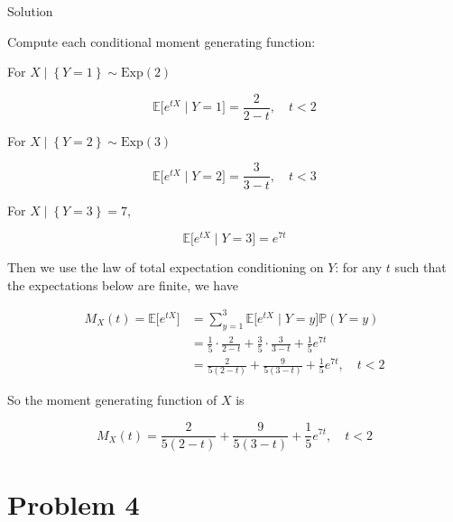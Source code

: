 \begin{qlsolution}{Solution}

Compute each conditional moment generating function:

For \(\mathit{X} \mid \left\{ {\mathit{Y} = 1} \right\} \sim \text{Exp}(2)\)

\[\mathbb{E}\lbrack\mathit{e}^{\mathit{t}\mathit{X}} \mid \mathit{Y} = 1\rbrack = \frac{2}{2 - \mathit{t}},\quad\mathit{t} < 2\]

For \(\mathit{X} \mid \left\{ {\mathit{Y} = 2} \right\} \sim \text{Exp}(3)\)

\[\mathbb{E}\lbrack\mathit{e}^{\mathit{t}\mathit{X}} \mid \mathit{Y} = 2\rbrack = \frac{3}{3 - \mathit{t}},\quad\mathit{t} < 3\]

For \(\mathit{X} \mid \left\{ {\mathit{Y} = 3} \right\} = 7\),

\[\mathbb{E}\lbrack\mathit{e}^{\mathit{t}\mathit{X}} \mid \mathit{Y} = 3\rbrack = \mathit{e}^{7\mathit{t}}\]

Then we use the law of total expectation conditioning on \(\mathit{Y}\): for any \(\mathit{t}\) such that the expectations below are finite, we have

\[\begin{matrix}
{\mathit{M}_{\mathit{X}}(\mathit{t}) = \mathbb{E}\lbrack\mathit{e}^{\mathit{t}\mathit{X}}\rbrack} & {= \sum\limits_{\mathit{y} = 1}^{3}\mathbb{E}\lbrack\mathit{e}^{\mathit{t}\mathit{X}} \mid \mathit{Y} = \mathit{y}\rbrack\mathbb{P}(\mathit{Y} = \mathit{y})} \\
 & {= \frac{1}{5} \cdot \frac{2}{2 - \mathit{t}} + \frac{3}{5} \cdot \frac{3}{3 - \mathit{t}} + \frac{1}{5}\mathit{e}^{7\mathit{t}}} \\
 & {= \frac{2}{5(2 - \mathit{t})} + \frac{9}{5(3 - \mathit{t})} + \frac{1}{5}\mathit{e}^{7\mathit{t}},\quad\mathit{t} < 2}
\end{matrix}\]

So the moment generating function of \(\mathit{X}\) is

\[\mathit{M}_{\mathit{X}}(\mathit{t}) = \frac{2}{5(2 - \mathit{t})} + \frac{9}{5(3 - \mathit{t})} + \frac{1}{5}\mathit{e}^{7\mathit{t}},\quad\mathit{t} < 2\]

\end{qlsolution}

\section{Problem 4}\label{hw04-problem-4}

